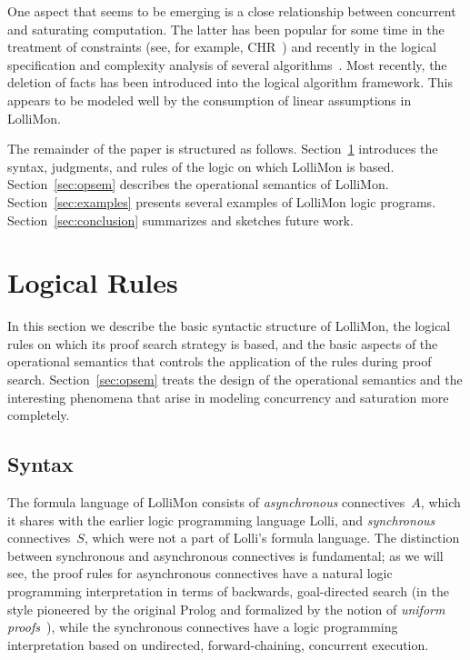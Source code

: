 \documentclass{sig-alt}
\begin{document}
One aspect that seems to be emerging is a close relationship between
concurrent and saturating computation.  The latter has been popular
for some time in the treatment of constraints (see, for example,
CHR~\cite{Fruehwirth98jlp}) and recently in the logical specification
and complexity analysis of several
algorithms~\cite{Ganzinger01ijcar,Mcallester02jacm}.  Most recently,
the deletion of facts has been introduced into the logical algorithm
framework. This appears to be modeled well by the consumption of
linear assumptions in LolliMon.

The remainder of the paper is structured as follows.
Section~\ref{sec:logical-rules} introduces the syntax, judgments, and
  rules of the logic on which LolliMon is based.
Section~\ref{sec:opsem} describes the operational semantics of LolliMon.
Section~\ref{sec:examples} presents several examples of LolliMon logic
  programs.
Section~\ref{sec:conclusion} summarizes and sketches future work.

\section{Logical Rules}
\label{sec:logical-rules}

In this section
 we describe the basic syntactic structure of LolliMon,
the logical rules on which its proof search strategy is based, and the
basic aspects of the operational semantics that controls the application of
the rules during proof search. Section~\ref{sec:opsem} treats the design
of the operational semantics and the interesting phenomena that arise
in modeling concurrency and saturation more completely.

\subsection{Syntax}
The formula language of LolliMon consists of \emph{asynchronous}
connectives~$A$, which it shares with the earlier logic programming
language Lolli, and \emph{synchronous} connectives~$S$, which were not
a part of Lolli's formula language.  The distinction between
synchronous and asynchronous connectives is fundamental; as we will
see, the proof rules for asynchronous connectives have a natural logic
programming interpretation in terms of backwards, goal-directed search
(in the style pioneered by the original Prolog and formalized by the
notion of \emph{uniform proofs}~\cite{Miller91apal}), while the
synchronous connectives have a logic programming interpretation based
on undirected, forward-chaining, concurrent execution.
\end{document}
